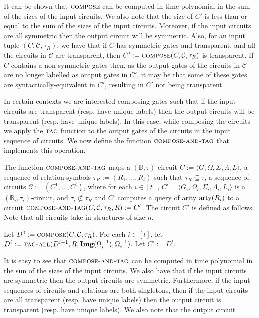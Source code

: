 \documentclass[../paper.tex]{subfiles}
\begin{document}
It can be shown that ${\normalfont\textsc{compose}}$ can be computed in time polynomial in the
sum of the sizes of the input circuits. We also note that the size of $C'$ is
less than or equal to the sum of the sizes of the input circuits. Moreover, if
the input circuits are all symmetric then the output circuit will be symmetric.
Also, for an input tuple $(C, \mathcal{C}, \tau_R)$, we have that if $C$ has
symmetric gates and transparent, and all the circuits in $\mathcal{C}$ are
transparent, then $C' := {\normalfont\textsc{compose}}(C, \mathcal{C}, \tau_R)$ is transparent.
If $C$ contains a non-symmetric gates then, as the output gates of the circuits
in $\mathcal{C}$ are no longer labelled as output gates in $C'$, it may be that
some of these gates are syntactically-equivalent in $C'$, resulting in $C'$ not
being transparent.

In certain contexts we are interested composing gates such that if the input
circuits are transparent (resp. have unique labels) then the output circuits
will be transparent (resp. have unique labels). In this case, while composing
the circuits we apply the ${\normalfont\textsc{tag}}$ function to the output gates of the
circuits in the input sequence of circuits. We now define the function
${\normalfont\textsc{compose-and-tag}}$ that implements this operation.

\begin{definition}
  The function ${\normalfont\textsc{compose-and-tag}}$ maps a $(\mathbb{B}, \tau)$-circuit $C :=
  \langle G, \Omega, \Sigma, \Lambda, L \rangle$, a sequence of relation symbols
  $\tau_R := (R_1, \ldots, R_t)$ such that $\tau_R \subseteq \tau$, a sequence
  of circuits $\mathcal{C} := ( C^1, \ldots, C^t)$, where for each $i \in [t]$,
  $C^i = \langle G_i, \Omega_i, \Sigma_i, \Lambda_i, L_i \rangle$ is a
  $(\mathbb{B}_i, \tau_i)$-circuit, and $\tau_i \not\subset \tau_R$ and $C^i$
  computes a query of arity $\mathrm{arty}(R_i)$ to a circuit ${\normalfont\textsc{compose-and-tag}}(C,
  \mathcal{C}, \tau_R, R) := C'$. The circuit $C'$ is defined as follows. Note
  that all circuits take in structures of size $n$.
  
  Let $D^0 := {\normalfont\textsc{compose}}(C, \mathcal{C}, \tau_R)$. For each $i \in [t]$, let
  $D^{i} := {\normalfont\textsc{tag-all}}(D^{i-1}, R, \text{\textbf{Img}}(\Omega^{-1}_i), \Omega^{-1}_i)$. Let
  $C' := D^t$.
\end{definition}

It is easy to see that ${\normalfont\textsc{compose-and-tag}}$ can be computed in time polynomial
in the sun of the sizes of the input circuits. We also have that if the input
circuits are symmetric then the output circuits are symmetric. Furthermore, if
the input sequences of circuits and relations are both singletons, then if the
input circuits are all transparent (resp. have unique labels) then the output
circuit is transparent (resp. have unique labels). We also note that the output
circuit
\end{document}
